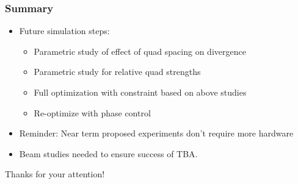 \documentclass[professionalfonts,t]{beamer}
\begin{document}
\begin{frame}
	\frametitle{Summary}
	\begin{itemize}
		\item Future simulation steps:
		\begin{itemize}
			\item Parametric study of effect of quad spacing on divergence
			\item Parametric study for relative quad strengths
			\item Full optimization with constraint based on above studies
			\item Re-optimize with phase control

		\end{itemize}
		\item Reminder: Near term proposed experiments don't require more hardware
		\item Beam studies needed to ensure success of TBA.
		
	\end{itemize}

	\vspace{1em}
	\centering
	\color{blue}\huge{Thanks for your attention!}

\end{frame}

\end{document}
